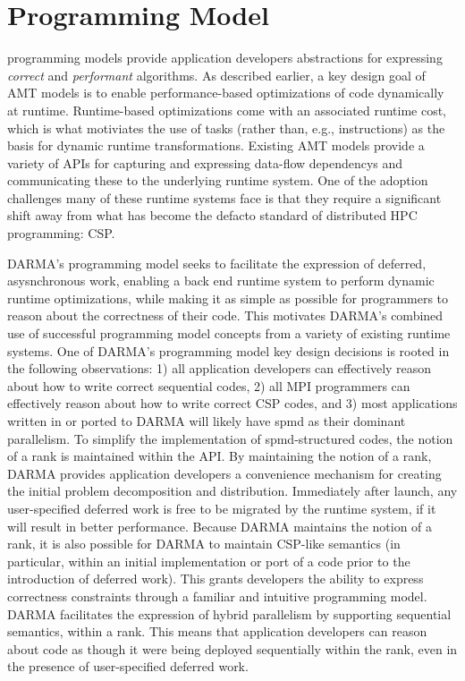 

\section{Programming Model}
\label{sec:programmingmodel}
\Glspl{programming model} provide application developers 
abstractions for expressing \emph{correct} and \emph{performant} algorithms. 
As described earlier, a key design goal of \gls{AMT} models is to enable performance-based
optimizations of code dynamically at runtime.
Runtime-based optimizations come with an associated runtime cost, which is what
motiviates the use of \glspl{task} (rather than, e.g., instructions) as the basis for dynamic runtime transformations.
Existing \gls{AMT} models provide a variety of \glspl{API} for capturing and expressing
\glspl{data-flow dependency} and communicating these to the underlying
\gls{runtime system}.  
One of the adoption challenges many of these \glspl{runtime system} face is
that they require a significant shift away from what has become
the defacto standard of distributed HPC programming: \gls{CSP}. 

\gls{DARMA}'s \gls{programming model} seeks to facilitate the expression of
deferred, asysnchronous work, enabling a \gls{back end} \gls{runtime system}
to perform dynamic runtime optimizations, while making it as simple as possible
for programmers to reason about the correctness of their code.
This motivates \gls{DARMA}'s combined use of successful \gls{programming model}
concepts from a variety of existing \glspl{runtime system}. 
One of \gls{DARMA}'s \gls{programming model} key design decisions is rooted in
the following observations: 
1) all application
developers can effectively reason about how to write correct sequential codes,
2) all MPI
programmers can effectively reason about how to write correct \gls{CSP} codes,
and
3) most applications written in or ported to \gls{DARMA} will likely
have \gls{spmd} as their dominant parallelism.
To simplify the implementation of \gls{spmd}-structured codes, the notion of a
\gls{rank} is maintained within the \gls{API}.   
By maintaining the notion of a \gls{rank}, \gls{DARMA} provides application developers a convenience mechanism for creating
the initial problem decomposition and distribution.
Immediately after launch, any user-specified \gls{deferred work} is free to be
migrated by the \gls{runtime system}, if it will result in
better performance.
Because \gls{DARMA} maintains the notion of a \gls{rank}, it is also
possible for \gls{DARMA} to maintain \gls{CSP}-like semantics (in particular, within an initial
implementation or port of a code prior to the introduction of \gls{deferred
work}). 
This grants developers the ability to express correctness constraints through a familiar and
intuitive \gls{programming model}.  
\gls{DARMA} facilitates the expression of hybrid parallelism by supporting  
\gls{sequential semantics}, within a \gls{rank}.  This means that application
developers can reason about code as
though it were being deployed sequentially within the \gls{rank}, even in
the presence of user-specified \gls{deferred work}.   

